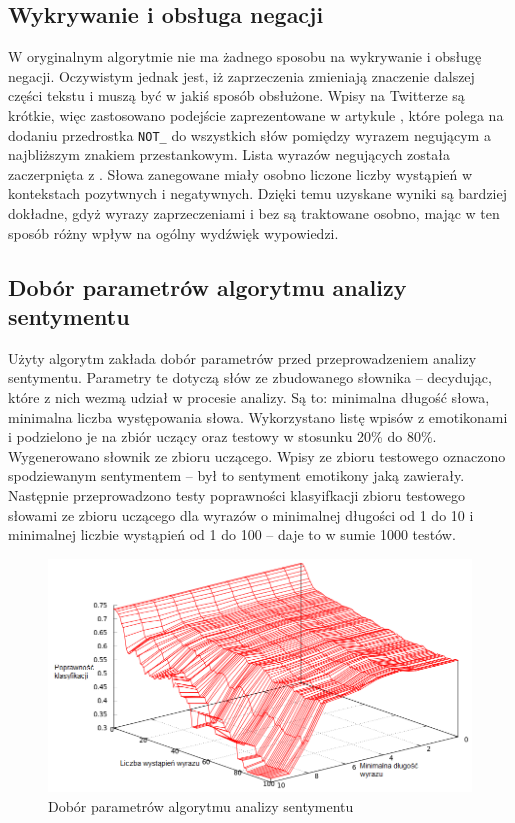 \subsection{Wykrywanie i obsługa negacji}
\label{subsubsection:wykrywanieiobsluganegacji}
W oryginalnym algorytmie  nie ma żadnego sposobu na
wykrywanie i obsługę negacji. Oczywistym jednak jest, iż zaprzeczenia zmieniają
znaczenie dalszej części tekstu i muszą być w jakiś sposób obsłużone.
Wpisy na Twitterze są krótkie, więc zastosowano podejście
zaprezentowane w artykule \cite{thumbsUp2002}, które polega na dodaniu
przedrostka \texttt{NOT\_} do wszystkich słów pomiędzy wyrazem negującym
a najbliższym znakiem przestankowym. Lista wyrazów negujących
została zaczerpnięta z \cite{englishNots1983}. Słowa zanegowane miały osobno
liczone liczby wystąpień w kontekstach pozytwnych i negatywnych.
Dzięki temu uzyskane wyniki są bardziej dokładne, gdyż wyrazy zaprzeczeniami i
bez są traktowane osobno, mając w ten sposób różny wpływ na ogólny wydźwięk
wypowiedzi.







\subsection{Dobór parametrów algorytmu analizy sentymentu}
\label{subsubsection:doborparametrow}
Użyty algorytm  zakłada dobór parametrów
przed przeprowadzeniem analizy sentymentu. Parametry te dotyczą słów ze zbudowanego słownika --
decydując, które z nich wezmą udział w procesie analizy. Są to: minimalna
długość słowa, minimalna liczba występowania słowa. 
Wykorzystano listę wpisów z emotikonami i podzielono je na zbiór uczący oraz
testowy w stosunku 20\% do 80\%.
Wygenerowano słownik ze zbioru uczącego. Wpisy ze zbioru testowego oznaczono
spodziewanym sentymentem -- był to sentyment emotikony jaką zawierały. Następnie
przeprowadzono testy poprawności klasyifkacji zbioru testowego słowami ze
zbioru uczącego dla wyrazów o minimalnej długości od 1 do 10 i minimalnej
liczbie wystąpień od 1 do 100 -- daje to w sumie 1000 testów.

\begin{figure}[ht!]
\centering
\includegraphics[width=130mm]{img/pak-paroubek-params_pl.png}
\caption{Dobór parametrów algorytmu analizy sentymentu}
\label{image:pak-paroubek-parametry}
\end{figure}

